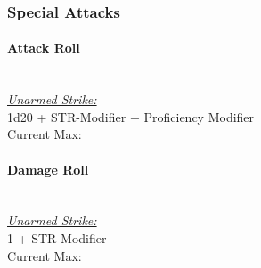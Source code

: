 \documentclass[letterpaper,openany,oneside,twocolumn]{book}
\newcommand{\PATH}{../../}
\begin{document}
\subsubsection*{Special Attacks}
\paragraph*{Attack Roll}\hfill\\
\underline{\textit{Unarmed Strike:}}\\
1d20 + STR-Modifier + Proficiency Modifier\\
\indent Current Max: 
\paragraph*{Damage Roll}\hfill\\
\underline{\textit{Unarmed Strike:}}\\
1 + STR-Modifier\\
\indent Current Max: 



\end{document}
